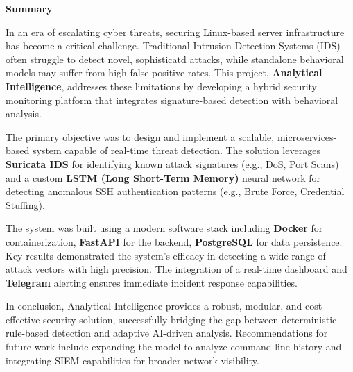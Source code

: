 \documentclass[12pt,a4paper]{report} %
\begin{document}
\clearpage
{}


\begin{mdframed}[
  linewidth=0.8pt,
  roundcorner=2pt,
  skipabove=10pt,
  skipbelow=14pt,
  innerleftmargin=14pt,
  innerrightmargin=14pt,
  innertopmargin=25pt,   %
  innerbottommargin=25pt
]


  \begin{center}
    {\bfseries\large Summary}
  \end{center}

  \vspace{6pt}
  {\normalsize
  In an era of escalating cyber threats, securing Linux-based server infrastructure has become a critical challenge. Traditional Intrusion Detection Systems (IDS) often struggle to detect novel, sophisticatd attacks, while standalone behavioral models may suffer from high false positive rates. This project, \textbf{Analytical Intelligence}, addresses these limitations by developing a hybrid security monitoring platform that integrates signature-based detection with behavioral analysis.

  The primary objective was to design and implement a scalable, microservices-based system capable of real-time threat detection. The solution leverages \textbf{Suricata IDS} for identifying known attack signatures (e.g., DoS, Port Scans) and a custom \textbf{LSTM (Long Short-Term Memory)} neural network for detecting anomalous SSH authentication patterns (e.g., Brute Force, Credential Stuffing).

  The system was built using a modern software stack including \textbf{Docker} for containerization, \textbf{FastAPI} for the backend, \textbf{PostgreSQL} for data persistence. Key results demonstrated the system's efficacy in detecting a wide range of attack vectors with high precision. The integration of a real-time dashboard and \textbf{Telegram} alerting ensures immediate incident response capabilities.

  In conclusion, Analytical Intelligence provides a robust, modular, and cost-effective security solution, successfully bridging the gap between deterministic rule-based detection and adaptive AI-driven analysis. Recommendations for future work include expanding the model to analyze command-line history and integrating SIEM capabilities for broader network visibility.
  }
\end{mdframed}
\end{document}
